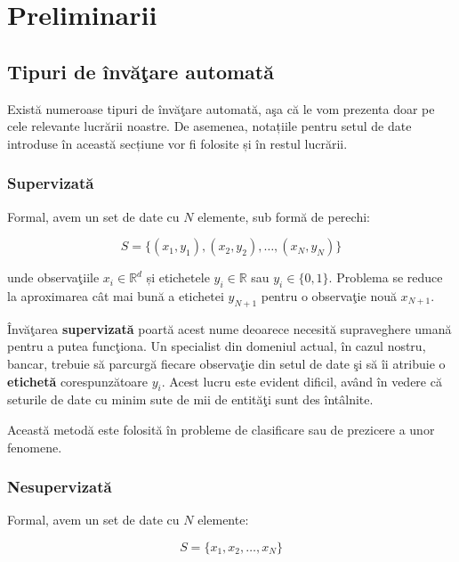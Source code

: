 \chapter{Preliminarii}

\section{Tipuri de învăţare automată}

Există numeroase tipuri de învăţare automată, aşa că le vom prezenta doar 
pe cele relevante lucrării noastre. De asemenea, notațiile pentru setul de 
date introduse în această secțiune vor fi folosite și în restul lucrării.

\subsection{Supervizată}

Formal, avem un set de date cu $N$ elemente, sub formă de perechi:

\begin{equation}
    S = \{(x_{1}, y_{1}), (x_{2}, y_{2}), \dots, (x_{N}, y_{N})\}
\end{equation}

unde observaţiile $x_{i} \in \mathbb{R} ^ d$ și etichetele 
$y_{i} \in \mathbb{R}$ sau $y_{i} \in \{0, 1\}$. 
Problema se reduce la 
aproximarea cât mai bună a etichetei $y_{N + 1}$ pentru o observaţie nouă 
$x_{N + 1}$.

Învăţarea \textbf{supervizată} poartă acest nume deoarece necesită supraveghere 
umană pentru a putea funcţiona. Un specialist
din domeniul actual, în cazul 
nostru, bancar, trebuie 
să parcurgă fiecare observaţie din setul de date şi să îi atribuie 
o \textbf{etichetă} corespunzătoare $y_{i}$. Acest lucru este evident dificil, având în 
vedere că seturile de date cu minim sute de mii de entităţi sunt des întâlnite.

Această metodă este folosită în probleme de clasificare sau de prezicere 
a unor fenomene.

\subsection{Nesupervizată}

Formal, avem un set de date cu $N$ elemente:

\begin{equation}
    S = \{x_{1}, x_{2}, \dots, x_{N}\}
\end{equation}

